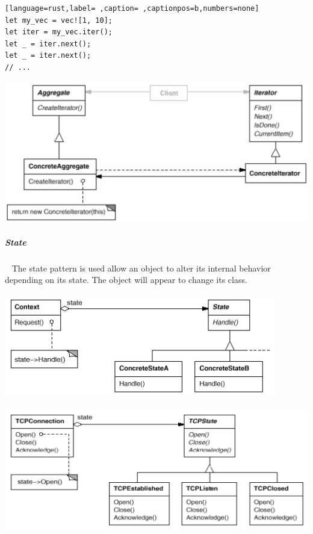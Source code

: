 \documentclass[11pt,twoside,landscape]{article}
\begin{document}
\begin{multicols}{3}
\begin{lstlisting}[language=rust,label= ,caption= ,captionpos=b,numbers=none]
let my_vec = vec![1, 10];
let iter = my_vec.iter();
let _ = iter.next();
let _ = iter.next();
// ...
\end{lstlisting}


{
\begin{center}
\includegraphics[width=.9\linewidth]{img/iterator.png}
\end{center}
\label{fig:iterator-class-diagram}
}
\subparagraph{State} \
\label{sec:orgcac0d82}
The state pattern is used allow an object to alter its internal behavior depending on its state.
The object will appear to change its class.

\begin{center}
\includegraphics[width=.9\linewidth]{img/state.png}
\end{center}
\label{fig:state-class-diagram}
\begin{center}
\includegraphics[width=.9\linewidth]{img/state_example.png}
\end{center}
\label{fig:tcp-connection-with-state}


\end{multicols}
\end{document}
